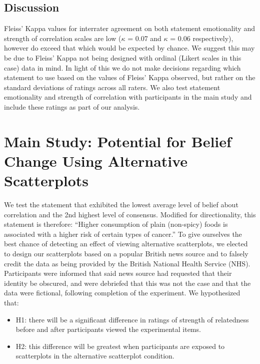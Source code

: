 \documentclass[manuscript,screen,review,anonymous]{acmart}
\providecommand{\tightlist}{%
  \setlength{\itemsep}{0pt}\setlength{\parskip}{0pt}}\usepackage{longtable,booktabs,array}
\begin{document}
\subsection{Discussion}\label{sec-discussion-pre}

Fleiss' Kappa values for interrater agreement on both statement
emotionality and strength of correlation scales are low (\(\kappa\) =
0.07 and \(\kappa\) = 0.06 respectively), however do exceed that which
would be expected by chance. We suggest this may be due to Fleiss' Kappa
not being designed with ordinal (Likert scales in this case) data in
mind. In light of this we do not make decisions regarding which
statement to use based on the values of Fleiss' Kappa observed, but
rather on the standard deviations of ratings across all raters. We also
test statement emotionality and strength of correlation with
participants in the main study and include these ratings as part of our
analysis.

\section{Main Study: Potential for Belief Change Using Alternative
Scatterplots}\label{sec-main-study}

We test the statement that exhibited the lowest average level of belief
about correlation and the 2nd highest level of consensus. Modified for
directionality, this statement is therefore: ``Higher consumption of
plain (non-spicy) foods is associated with a higher risk of certain
types of cancer.'' To give ourselves the best chance of detecting an
effect of viewing alternative scatterplots, we elected to design our
scatterplots based on a popular British news source and to falsely
credit the data as being provided by the British National Health Service
(NHS). Participants were informed that said news source had requested
that their identity be obscured, and were debriefed that this was not
the case and that the data were fictional, following completion of the
experiment. We hypothesized that:

\begin{itemize}
\tightlist
\item
  H1: there will be a significant difference in ratings of strength of
  relatedness before and after participants viewed the experimental
  items.
\item
  H2: this difference will be greatest when participants are exposed to
  scatterplots in the alternative scatterplot condition.
\end{itemize}
\end{document}
